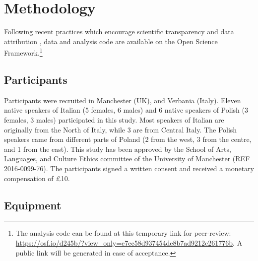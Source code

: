 \documentclass[preprint]{JASAnew}
\begin{document}
\hypertarget{methodology}{%
\section{Methodology}\label{methodology}}

Following recent practices which encourage scientific transparency and
data attribution \citep{cruwell2018, berez-kroeker2018, roettger2019},
data \citep{coretta2018m} and analysis code are available on the Open
Science
Framework.\footnote{The analysis code can be found at this temporary link for peer-review: \url{https://osf.io/d245b/?view_only=c7ec58d937454de8b7ad9212c261776b}. A public link will be generated in case of acceptance.}

\hypertarget{participants}{%
\subsection{Participants}\label{participants}}

Participants were recruited in Manchester (UK), and Verbania (Italy).
Eleven native speakers of Italian (5 females, 6 males) and 6 native
speakers of Polish (3 females, 3 males) participated in this study. Most
speakers of Italian are originally from the North of Italy, while 3 are
from Central Italy. The Polish speakers came from different parts of
Poland (2 from the west, 3 from the centre, and 1 from the east). This
study has been approved by the School of Arts, Languages, and Culture
Ethics committee of the University of Manchester (REF 2016-0099-76). The
participants signed a written consent and received a monetary
compensation of £10.

\hypertarget{equipment}{%
\subsection{Equipment}\label{equipment}}

\label{s:equipment}
\end{document}
